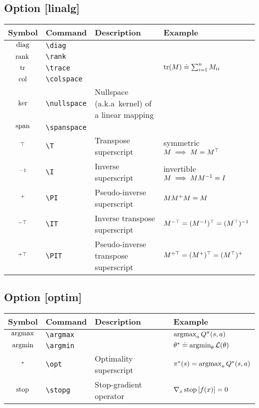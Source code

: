 \documentclass{article}
\begin{document}

\subsection*{Option [linalg]}

\begin{tabular}{clll}
  \toprule
  Symbol & Command & Description & Example \\
  \midrule
  $\operatorname*{diag}$ & \verb|\diag| & & \\
  $\operatorname*{rank}$ & \verb|\rank| & & \\
  $\operatorname*{tr}$ & \verb|\trace| & & $\operatorname*{tr}(M) \doteq \sum_{i=1}^n M_{ii}$ \\
  $\operatorname*{col}$ & \verb|\colspace| & & \\
  $\operatorname*{ker}$ & \verb|\nullspace| & Nullspace (a.k.a\ kernel) of a linear mapping & \\
  $\operatorname*{span}$ & \verb|\spanspace| & & \\
  $^\top$ & \verb|\T| & Transpose superscript & symmetric $M \implies M = M^\top$ \\
  $^{-1}$ & \verb|\I| & Inverse superscript & invertible $M \implies MM^{-1} = I$ \\
  $^{+}$ & \verb|\PI| & Pseudo-inverse superscript & $MM^{+} M = M$ \\
  $^{-\top}$ & \verb|\IT| & Inverse transpose superscript & $M^{-\top} = (M^{-1})^\top = (M^\top)^{-1}$ \\
  $^{+\top}$ & \verb|\PIT| & Pseudo-inverse transpose superscript & $M^{+\top} = (M^{+})^\top = (M^\top)^{+}$ \\
  \bottomrule
\end{tabular}

\subsection*{Option [optim]}

\begin{tabular}{clll}
  \toprule
  Symbol & Command & Description & Example \\
  \midrule
  $\operatorname*{argmax}$ & \verb|\argmax| & & $\operatorname*{argmax}_a Q^{\pi}(s, a)$ \\
  $\operatorname*{argmin}$ & \verb|\argmin| & & $\theta^{*} \doteq \operatorname*{argmin}_\theta \mathcal{L}(\theta)$ \\
  $^{*}$ & \verb|\opt| & Optimality superscript & $\pi^{*}(s) = \operatorname*{argmax}_a Q^{*}(s, a)$ \\
  \midrule
  $\operatorname*{stop}$ & \verb|\stopg| & Stop-gradient operator & $\nabla_x \operatorname*{stop}\left[ f(x) \right] = 0$ \\
  \bottomrule
\end{tabular}
\end{document}
